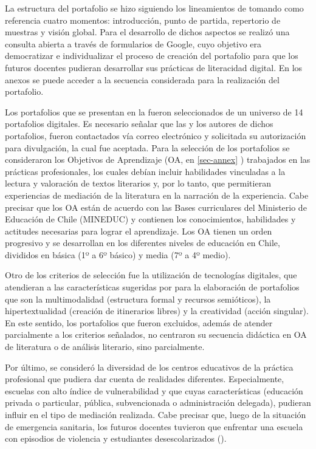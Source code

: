 La estructura del portafolio se hizo siguiendo los lineamientos de
\textcite{gonzalez_pujola_2008} tomando como referencia cuatro momentos:
introducción, punto de partida, repertorio de muestras y visión global.
Para el desarrollo de dichos aspectos se realizó una consulta abierta a
través de formularios de Google, cuyo objetivo era democratizar e
individualizar el proceso de creación del portafolio para que los
futuros docentes pudieran desarrollar sus prácticas de literacidad
digital. En los anexos se puede acceder a la secuencia considerada para
la realización del portafolio.

Los portafolios que se presentan en la  fueron seleccionados de
un universo de 14 portafolios digitales. Es necesario señalar que las y
los autores de dichos portafolios, fueron contactados vía correo
electrónico y solicitada su autorización para divulgación, la cual fue
aceptada. Para la selección de los portafolios se consideraron los
Objetivos de Aprendizaje (OA, en \cref{sec-annex} ) trabajados en las prácticas
profesionales, los cuales debían incluir habilidades vinculadas a la
lectura y valoración de textos literarios y, por lo tanto, que
permitieran experiencias de mediación de la literatura en la narración
de la experiencia. Cabe precisar que los OA están de acuerdo con las
Bases curriculares del Ministerio de Educación de Chile (MINEDUC) y
contienen los conocimientos, habilidades y actitudes necesarias para
lograr el aprendizaje. Los OA tienen un orden progresivo y se
desarrollan en los diferentes niveles de educación en Chile, divididos
en básica (1º a 6º básico) y media (7º a 4º medio).

Otro de los criterios de selección fue la utilización de tecnologías
digitales, que atendieran a las características sugeridas por \textcite{costa2019multimodalidad} para la elaboración de portafolios que son la
multimodalidad (estructura formal y recursos semióticos), la
hipertextualidad (creación de itinerarios libres) y la creatividad
(acción singular). En este sentido, los portafolios que fueron
excluidos, además de atender parcialmente a los criterios señalados, no
centraron su secuencia didáctica en OA de literatura o de análisis
literario, sino parcialmente.

Por último, se consideró la diversidad de los centros educativos de la
práctica profesional que pudiera dar cuenta de realidades diferentes.
Especialmente, escuelas con alto índice de vulnerabilidad y que cuyas
características (educación privada o particular, pública, subvencionada
o administración delegada), pudieran influir en el tipo de mediación
realizada. Cabe precisar que, luego de la situación de emergencia
sanitaria, los futuros docentes tuvieron que enfrentar una escuela con
episodios de violencia y estudiantes desescolarizados \cite{figueroa2022escuela} ().
	
